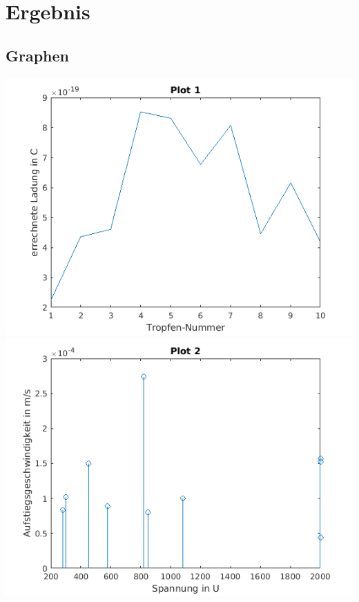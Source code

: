 \section*{Ergebnis}
\subsection*{Graphen}
\includegraphics[scale=0.8]{plot1.png}
\\
\includegraphics[scale=0.8]{plot2.png}